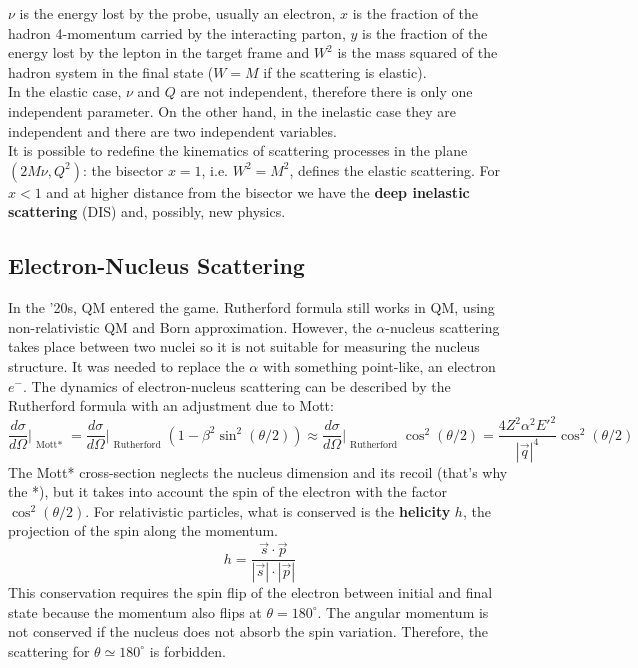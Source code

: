 \documentclass[10.75pt,a4paper,openright,bottom=2cm]{article}
\begin{document}
\noindent
$\nu$ is the energy lost by the probe, usually an electron, $x$ is the fraction of the hadron 4-momentum carried by the interacting parton, $y$ is the fraction of the energy lost by the lepton in the target frame and $W^2$ is the mass squared of the hadron system in the final state ($W=M$ if the scattering is elastic).\\
In the elastic case, $\nu$ and $Q$ are not independent, therefore there is only one independent parameter. On the other hand, in the inelastic case they are independent and there are two independent variables.\\
It is possible to redefine the kinematics of scattering processes in the plane $(2M\nu,Q^2)$: the bisector $x=1$, i.e. $W^2=M^2$, defines the elastic scattering. For $x<1$ and at higher distance from the bisector we have the \textbf{deep inelastic scattering} (DIS) and, possibly, new physics.
\subsection{Electron-Nucleus Scattering}
In the '20s, QM entered the game. Rutherford formula still works in QM, using non-relativistic QM and Born approximation. However, the $\alpha$-nucleus scattering takes place between two nuclei so it is not suitable for measuring the nucleus structure. It was needed to replace the $\alpha$ with something point-like, an electron $e^-$. The dynamics of electron-nucleus scattering can be described by the Rutherford formula with an adjustment due to Mott:
\[
\frac{d\sigma}{d\Omega}\Bigr|_{\substack{\text{Mott*}}}=\frac{d\sigma}{d\Omega}\Bigr|_{\substack{\text{Rutherford}}}\left(1-\beta^2\sin^2(\theta/2)\right)\approx\frac{d\sigma}{d\Omega}\Bigr|_{\substack{\text{Rutherford}}}\cos^2(\theta/2)=\frac{4Z^2\alpha^2E'^2}{|\Vec{q}|^4}\cos^2(\theta/2)
\]
The Mott* cross-section neglects the nucleus dimension and its recoil (that's why the *), but it takes into account the spin of the electron with the factor $\cos^2(\theta/2)$. For relativistic particles, what is conserved is the \textbf{helicity} $h$, the projection of the spin along the momentum. 
\[
h=\frac{\Vec{s}\cdot\Vec{p}}{|\Vec{s}|\cdot|\Vec{p}|}
\]
This conservation requires the spin flip of the electron between initial and final state because the momentum also flips at $\theta=180^\circ$. The angular momentum is not conserved if the nucleus does not absorb the spin variation. Therefore, the scattering for $\theta\simeq180^\circ$ is forbidden.
\end{document}
